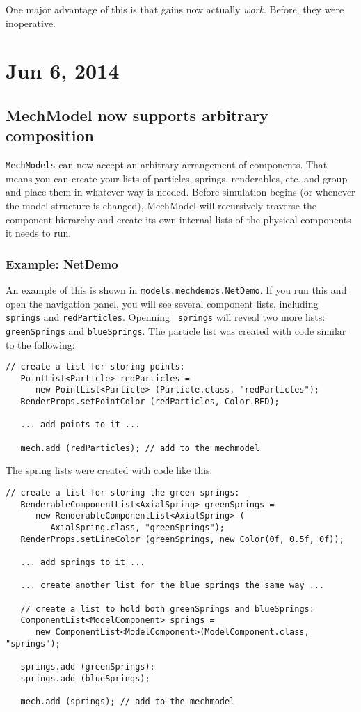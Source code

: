 \documentclass{article}
\begin{document}
One major advantage of this is that gains now actually {\it work}.
Before, they were inoperative.

\section*{Jun 6, 2014}

\subsection*{MechModel now supports arbitrary composition}

{\tt MechModels} can now accept an arbitrary arrangement of
components. That means you can create your lists of particles,
springs, renderables, etc. and group and place them in whatever way is
needed. Before simulation begins (or whenever the model structure is
changed), MechModel will recursively traverse the component hierarchy
and create its own internal lists of the physical components it needs
to run.

\subsubsection*{Example: NetDemo}

An example of this is shown in {\tt models.mechdemos.NetDemo}.  If you
run this and open the navigation panel, you will see several component
lists, including {\tt springs} and {\tt redParticles}. Openning {\tt
springs} will reveal two more lists: {\tt greenSprings} and
{\tt blueSprings}. The particle list was created with code
similar to the following:
\begin{lstlisting}[]
   // create a list for storing points:
   PointList<Particle> redParticles =
      new PointList<Particle> (Particle.class, "redParticles");
   RenderProps.setPointColor (redParticles, Color.RED);

   ... add points to it ...
  
   mech.add (redParticles); // add to the mechmodel
\end{lstlisting}
The spring lists were created with code like this:
\begin{lstlisting}[]
   // create a list for storing the green springs:
   RenderableComponentList<AxialSpring> greenSprings =
      new RenderableComponentList<AxialSpring> (
         AxialSpring.class, "greenSprings");
   RenderProps.setLineColor (greenSprings, new Color(0f, 0.5f, 0f));

   ... add springs to it ...

   ... create another list for the blue springs the same way ...

   // create a list to hold both greenSprings and blueSprings:
   ComponentList<ModelComponent> springs =
      new ComponentList<ModelComponent>(ModelComponent.class, "springs");

   springs.add (greenSprings);
   springs.add (blueSprings);
  
   mech.add (springs); // add to the mechmodel
\end{lstlisting}
\end{document}
